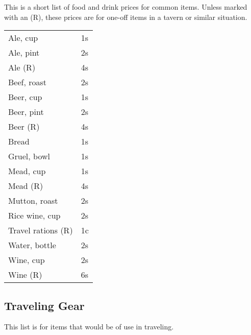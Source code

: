 This is a short list of food and drink prices for common items.
Unless marked with an (R), these prices are for one-off items in
a tavern or similar situation.

\begin{center}
{
\begin{xtabular}{|l|l|}
Ale, cup & 1s \\
Ale, pint & 2s \\
Ale (R) & 4s \\
Beef, roast & 2s \\
Beer, cup & 1s \\
Beer, pint & 2s \\
Beer (R) & 4s \\
Bread & 1s \\
Gruel, bowl & 1s \\
Mead, cup & 1s \\
Mead (R) & 4s \\
Mutton, roast & 2s \\
Rice wine, cup & 2s \\
Travel rations (R) & 1c \\
Water, bottle & 2s \\
Wine, cup & 2s \\
Wine (R) & 6s \\
\hline
\end{xtabular}
}
\end{center}

\subsection{Traveling Gear}

This list is for items that would be of use in traveling.

